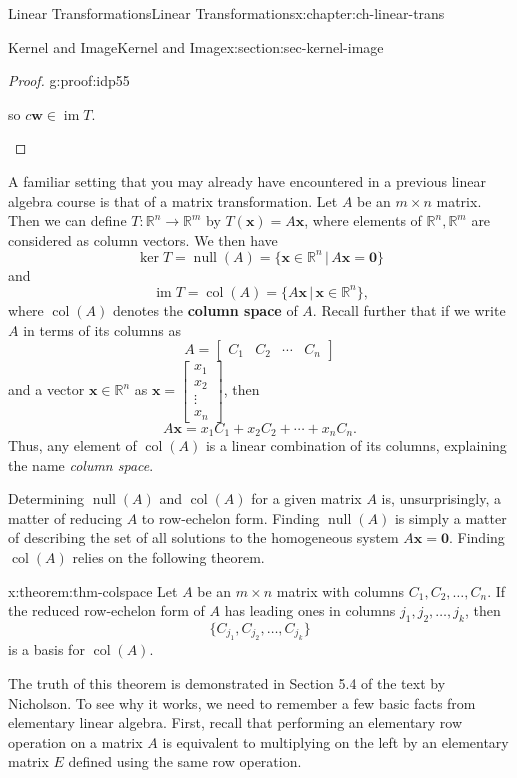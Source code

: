 \documentclass[oneside,10pt,]{book}
\newcommand{\terminology}[1]{\textbf{#1}}
\numberwithin{equation}{section}
\newcommand{\bbm}{\begin{bmatrix}}
\newcommand{\ebm}{\end{bmatrix}}
\newcommand{\R}{\mathbb{R}}
\newcommand{\im}{\operatorname{im}}
\newcommand{\nll}{\operatorname{null}}
\newcommand{\csp}{\operatorname{col}}
\newcommand{\ww}{\mathbf{w}}
\newcommand{\xx}{\mathbf{x}}
\newcommand{\amp}{&}
\begin{document}
\begin{chapterptx}{Linear Transformations}{}{Linear Transformations}{}{}{x:chapter:ch-linear-trans}
\begin{sectionptx}{Kernel and Image}{}{Kernel and Image}{}{}{x:section:sec-kernel-image}
\begin{proof}{}{g:proof:idp55}
\begin{enumerate}
so \(c\ww\in \im T\).%
\end{enumerate}
%
\end{proof}
A familiar setting that you may already have encountered in a previous linear algebra course is that of a matrix transformation. Let \(A\) be an \(m\times n\) matrix. Then we can define \(T:\R^n\to \R^m\) by \(T(\xx)=A\xx\), where elements of \(\R^n,\R^m\) are considered as column vectors. We then have%
\begin{equation*}
\ker T = \nll(A) = \{\xx\in \R^n \,|\, A\xx=\mathbf{0}\}
\end{equation*}
and%
\begin{equation*}
\im T = \csp(A) = \{A\xx\,|\, \xx\in \R^n\}\text{,}
\end{equation*}
where \(\csp(A)\) denotes the \terminology{column space} of \(A\). Recall further that if we write \(A\) in terms of its columns as%
\begin{equation*}
A = \bbm C_1 \amp C_2 \amp \cdots \amp C_n\ebm
\end{equation*}
and a vector \(\xx\in \R^n\) as \(\xx=\bbm x_1\\x_2\\\vdots \\x_n\ebm\), then%
\begin{equation*}
A\xx = x_1C_1+x_2C_2+\cdots +x_nC_n\text{.}
\end{equation*}
Thus, any element of \(\csp(A)\) is a linear combination of its columns, explaining the name \emph{column space}.%
\par
Determining \(\nll(A)\) and \(\csp(A)\) for a given matrix \(A\) is, unsurprisingly, a matter of reducing \(A\) to row-echelon form. Finding \(\nll(A)\) is simply a matter of describing the set of all solutions to the homogeneous system \(A\xx=\mathbf{0}\). Finding \(\csp(A)\) relies on the following theorem.%
\begin{theorem}{}{}{x:theorem:thm-colspace}%
Let \(A\) be an \(m\times n\) matrix with columns \(C_1,C_2,\ldots, C_n\). If the reduced row-echelon form of \(A\) has leading ones in columns \(j_1,j_2,\ldots, j_k\), then%
\begin{equation*}
\{C_{j_1},C_{j_2},\ldots, C_{j_k}\}
\end{equation*}
is a basis for \(\csp(A)\).%
\end{theorem}
The truth of this theorem is demonstrated in Section 5.4 of the text by Nicholson. To see why it works, we need to remember a few basic facts from elementary linear algebra. First, recall that performing an elementary row operation on a matrix \(A\) is equivalent to multiplying on the left by an elementary matrix \(E\) defined using the same row operation.%

\end{sectionptx}
\end{chapterptx}
\end{document}
